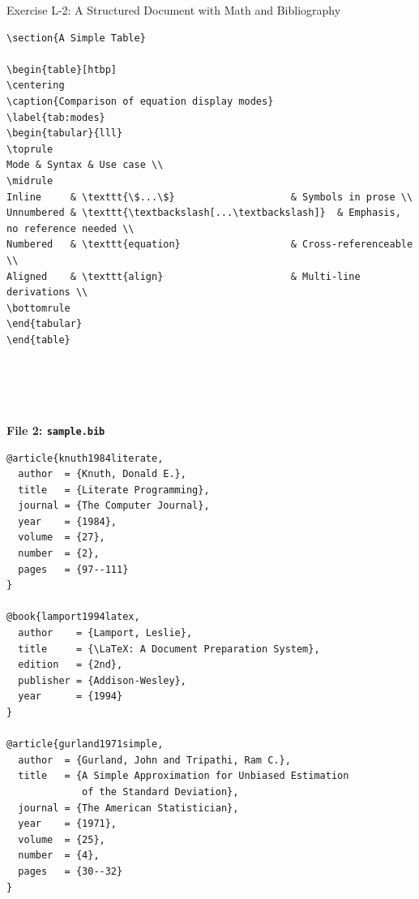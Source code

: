 \begin{infobox}{Exercise L-2: A Structured Document with Math and Bibliography}
\begin{lstlisting}[style=inlineStyle]
\section{A Simple Table}

\begin{table}[htbp]
\centering
\caption{Comparison of equation display modes}
\label{tab:modes}
\begin{tabular}{lll}
\toprule
Mode & Syntax & Use case \\
\midrule
Inline     & \texttt{\$...\$}                    & Symbols in prose \\
Unnumbered & \texttt{\textbackslash[...\textbackslash]}  & Emphasis, no reference needed \\
Numbered   & \texttt{equation}                   & Cross-referenceable \\
Aligned    & \texttt{align}                      & Multi-line derivations \\
\bottomrule
\end{tabular}
\end{table}





\end{lstlisting}

\vs
\noindent
\textbf{File 2: \texttt{sample.bib}}

\begin{lstlisting}[style=inlineStyle]
@article{knuth1984literate,
  author  = {Knuth, Donald E.},
  title   = {Literate Programming},
  journal = {The Computer Journal},
  year    = {1984},
  volume  = {27},
  number  = {2},
  pages   = {97--111}
}

@book{lamport1994latex,
  author    = {Lamport, Leslie},
  title     = {\LaTeX: A Document Preparation System},
  edition   = {2nd},
  publisher = {Addison-Wesley},
  year      = {1994}
}

@article{gurland1971simple,
  author  = {Gurland, John and Tripathi, Ram C.},
  title   = {A Simple Approximation for Unbiased Estimation
             of the Standard Deviation},
  journal = {The American Statistician},
  year    = {1971},
  volume  = {25},
  number  = {4},
  pages   = {30--32}
}
\end{lstlisting}
\end{infobox}

